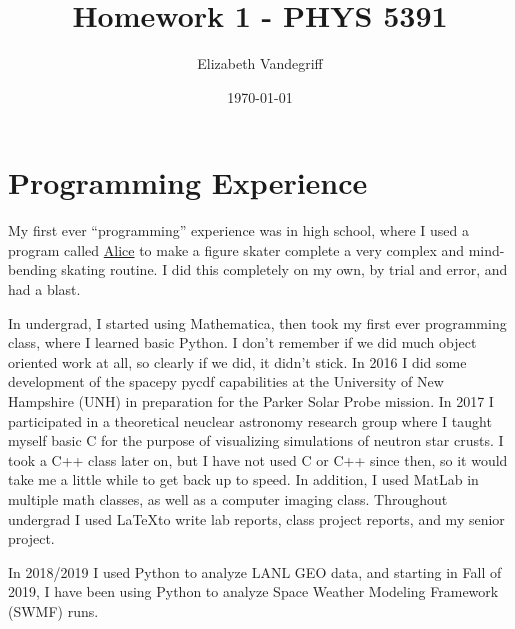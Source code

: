\documentclass[12pt, letterpaper]{article}
\begin{document}
\title{Homework 1 - PHYS 5391}
\author{Elizabeth Vandegriff}
\date{\today}

\maketitle
\newpage
\tableofcontents
\newpage

\section{Programming Experience}


My first ever ``programming'' experience was in high school, where I  used a program called \href{https://www.alice.org/}{Alice} to make a figure skater complete a very complex and mind-bending skating routine. I did this completely on my own, by trial and error, and had a blast.

In undergrad, I started using Mathematica, then took my first ever programming class, where I learned basic Python. I don't remember if we did much object oriented work at all, so clearly if we did, it didn't stick. In 2016 I did some development of the spacepy pycdf capabilities at the University of New Hampshire (UNH) in preparation for the Parker Solar Probe mission. In 2017 I participated in a theoretical neuclear astronomy research group where I taught myself basic C for the purpose of visualizing simulations of neutron star crusts. I took a C++ class later on, but I have not used C or C++ since then, so it would take me a little while to get back up to speed. In addition, I used MatLab in multiple math classes, as well as a computer imaging class. Throughout undergrad I used \LaTeX to write lab reports, class project reports, and my senior project.

In 2018/2019 I used Python to analyze LANL GEO data, and starting in Fall of 2019, I have been using Python to analyze Space Weather Modeling Framework (SWMF) runs.
\end{document}
